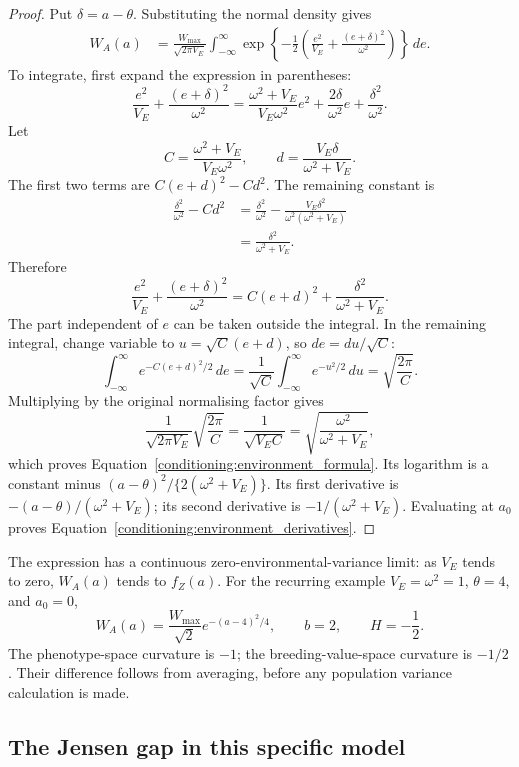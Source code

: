 \begin{proof}
Put \(\delta=a-\theta\). Substituting the normal density gives
\begin{align}
 W_A(a)
 &=\frac{W_{\max}}{\sqrt{2\pi V_E}}
   \int_{-\infty}^{\infty}
   \exp\!\left\{-\frac12
   \left(\frac{e^2}{V_E}+\frac{(e+\delta)^2}{\omega^2}\right)\right\}\,de.
 \label{conditioning:environment_integral}
\end{align}
To integrate, first expand the expression in parentheses:
\[
 \frac{e^2}{V_E}+\frac{(e+\delta)^2}{\omega^2}
 =\frac{\omega^2+V_E}{V_E\omega^2}e^2
   +\frac{2\delta}{\omega^2}e+\frac{\delta^2}{\omega^2}.
\]
Let
\[
 C=\frac{\omega^2+V_E}{V_E\omega^2},
 \qquad d=\frac{V_E\delta}{\omega^2+V_E}.
\]
The first two terms are \(C(e+d)^2-Cd^2\). The remaining constant is
\begin{align*}
 \frac{\delta^2}{\omega^2}-Cd^2
 &=\frac{\delta^2}{\omega^2}
   -\frac{V_E\delta^2}{\omega^2(\omega^2+V_E)}\\
 &=\frac{\delta^2}{\omega^2+V_E}.
\end{align*}
Therefore
\[
 \frac{e^2}{V_E}+\frac{(e+\delta)^2}{\omega^2}
 =C(e+d)^2+\frac{\delta^2}{\omega^2+V_E}.
\]
The part independent of \(e\) can be taken outside the integral. In the
remaining integral, change variable to \(u=\sqrt C(e+d)\), so
\(de=du/\sqrt C\):
\[
 \int_{-\infty}^{\infty}e^{-C(e+d)^2/2}\,de
 =\frac{1}{\sqrt C}\int_{-\infty}^{\infty}e^{-u^2/2}\,du
 =\sqrt{\frac{2\pi}{C}}.
\]
Multiplying by the original normalising factor gives
\[
 \frac{1}{\sqrt{2\pi V_E}}\sqrt{\frac{2\pi}{C}}
 =\frac{1}{\sqrt{V_EC}}
 =\sqrt{\frac{\omega^2}{\omega^2+V_E}},
\]
which proves Equation~\eqref{conditioning:environment_formula}. Its logarithm
is a constant minus \((a-\theta)^2/\{2(\omega^2+V_E)\}\). Its first derivative
is \(- (a-\theta)/(\omega^2+V_E)\); its second derivative is
\(-1/(\omega^2+V_E)\). Evaluating at \(a_0\) proves
Equation~\eqref{conditioning:environment_derivatives}.
\end{proof}

The expression has a continuous zero-environmental-variance limit:
as \(V_E\) tends to zero, \(W_A(a)\) tends to \(f_Z(a)\).
For the recurring example \(V_E=\omega^2=1\), \(\theta=4\), and \(a_0=0\),
\[
 W_A(a)=\frac{W_{\max}}{\sqrt2}e^{-(a-4)^2/4},
 \qquad b=2,\qquad H=-\frac12.
\]
The phenotype-space curvature is \(-1\); the breeding-value-space curvature
is \(-1/2\). Their difference follows from averaging, before any population
variance calculation is made.

\subsection{The Jensen gap in this specific model}

